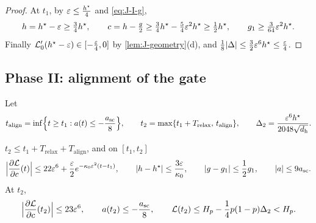 \begin{proof}
At $t_1$, by $\varepsilon\le\frac{h^\star}{4}$ and \cref{eq:J-I-g},
\[
  h= h^\star-\varepsilon\ge\tfrac{3}{4} h^\star,\qquad c= h-\tfrac{g}{2}\ge\tfrac{3}{4} h^\star-\tfrac{5}{4}\varepsilon^2 h^\star\ge\tfrac{1}{2} h^\star,\qquad  g_1\ge\tfrac{3}{64}\varepsilon^2 h^\star .
\]
Finally $ \mathcal L_0'( h^\star-\varepsilon)\in[-\frac{\varepsilon}{4},0]$ by \cref{lem:J-geometry}(d), and $\frac{1}{8}|\Delta|\le\frac{3}{2}\varepsilon^6 h^\star\le\frac{\varepsilon}{4}$.
\end{proof}

\subsection{Phase II: alignment of the gate}

Let
\begin{gather*}
 t_{\mathrm{align}}=\inf\Bigl\{t\ge t_1:a(t)\le-\frac{a_{\mathrm{sc}}}{8}\Bigr\},\qquad t_2=\max\{t_1+T_{\mathrm{relax}},\,t_{\mathrm{align}}\},\qquad
 \Delta_2=\frac{\varepsilon^6h^\star}{2048\sqrt{d_{\mathrm h}}}.
\end{gather*}

\begin{lemma}
\label{lem:J-phase2}
$t_2\le t_1+T_{\mathrm{relax}}+T_{\mathrm{align}}$, and on $[t_1,t_2]$
\[
 \Bigl|\pd{\mathcal L}{c}(t)\Bigr|\le22\initscale^6+\frac{\initscale}{2}e^{-\kappa_0\initscale^2(t-t_1)},\qquad |h-h^\star|\le\frac{3\initscale}{\kappa_0},\qquad
 |g-g_1|\le\frac{1}{2}g_1,\qquad |a|\le9a_{\mathrm{sc}} .
\]
At $t_2$,
\[
 \Bigl|\pd{\mathcal L}{c}(t_2)\Bigr|\le23\initscale^6,\qquad a(t_2)\le-\frac{a_{\mathrm{sc}}}{8},\qquad \mathcal L(t_2)\le H_p-\frac{1}{4}p(1-p)\Delta_2<H_p .
\]
\end{lemma}

